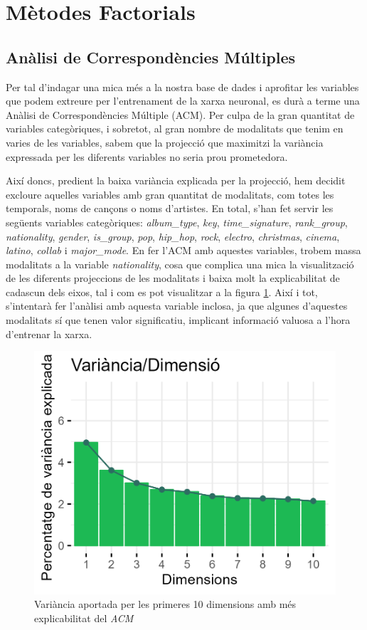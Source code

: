 \section{Mètodes Factorials}


\subsection{Anàlisi de Correspondències Múltiples}

Per tal d'indagar una mica més a la nostra base de dades i aprofitar les variables que podem extreure per l'entrenament de la xarxa neuronal, es durà a terme una Anàlisi de Correspondències Múltiple (ACM). Per culpa de la gran quantitat de variables categòriques, i sobretot, al gran nombre de modalitats que tenim en varies de les variables, sabem que la projecció que maximitzi la variància expressada per les diferents variables no seria prou prometedora.

Així doncs, predient la baixa variància explicada per la projecció, hem decidit excloure aquelles variables amb gran quantitat de modalitats, com totes les temporals, noms de cançons o noms d'artistes. En total, s'han fet servir les següents variables categòriques: \textit{album\_type}, \textit{key}, \textit{time\_signature},\textit{ rank\_group}, \textit{nationality}, \textit{gender},\textit{ is\_group}, \textit{pop}, \textit{hip\_hop}, \textit{rock}, \textit{electro}, \textit{christmas}, \textit{cinema}, \textit{latino}, \textit{collab} i \textit{major\_mode}. En fer l'ACM amb aquestes variables, trobem massa modalitats a la variable \textit{nationality}, cosa que complica una mica la visualització de les diferents projeccions de les modalitats i baixa molt la explicabilitat de cadascun dels eixos, tal i com es pot visualitzar a la figura \ref{fig:ACM1_varianciaDimensions}. Així i tot, s'intentarà fer l'anàlisi amb aquesta variable inclosa, ja que algunes d'aquestes modalitats sí que tenen valor significatiu, implicant informació valuosa a l'hora d'entrenar la xarxa.

\begin{figure}[H]
    \centering
    \includegraphics[width=0.5\linewidth]{Images/6_Factorial_Methods/ACM/ACM1_varianciaDimensions.png}
    \caption{Variància aportada per les primeres 10 dimensions amb més explicabilitat del \textit{ACM}}
    \label{fig:ACM1_varianciaDimensions}
\end{figure}

